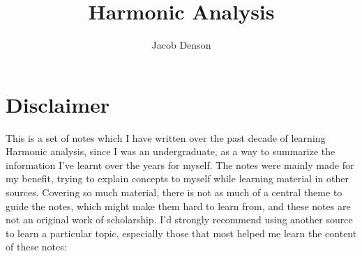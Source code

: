 

\title{Harmonic Analysis}
\author{Jacob Denson}


\makeatletter
\renewcommand*\l@section{\@dottedtocline{1}{1.5em}{3em}}
\makeatother



\maketitle

\chapter*{Disclaimer}

This is a set of notes which I have written over the past decade of learning Harmonic analysis, since I was an undergraduate, as a way to summarize the information I've learnt over the years for myself. The notes were mainly made for my benefit, trying to explain concepts to myself while learning material in other sources. Covering so much material, there is not as much of a central theme to guide the notes, which might make them hard to learn from, and these notes are not an original work of scholarship. I'd strongly recommend using another source to learn a particular topic, especially those that most helped me learn the content of these notes:

